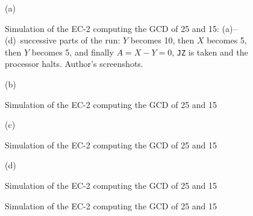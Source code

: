 \begin{figure}[htbp]
\centering
{\small (a)}\\[2pt]
\caption{Simulation of the EC-2 computing the GCD of 25 and 15: (a)--(d)~successive parts of the run: $Y$ becomes 10, then $X$ becomes 5, then $Y$ becomes 5, and finally $A=X-Y=0$, \texttt{JZ} is taken and the processor halts. Author's screenshots.}
\label{fig:ec2-sim}
\end{figure}

\begin{figure}[htbp]
\centering
\ContinuedFloat
{}
{\small (b)}\\[2pt]
\caption[]{Simulation of the EC-2 computing the GCD of 25 and 15}
\end{figure}

\begin{figure}[htbp]
\centering
\ContinuedFloat
{}
{\small (c)}\\[2pt]
\caption[]{Simulation of the EC-2 computing the GCD of 25 and 15}
\end{figure}

\begin{figure}[htbp]
\centering
\ContinuedFloat
{}
{\small (d)}\\[2pt]
\caption[]{Simulation of the EC-2 computing the GCD of 25 and 15}
\end{figure}

\begin{figure}[htbp]
\centering
\ContinuedFloat
{}
\caption[]{Simulation of the EC-2 computing the GCD of 25 and 15}
\end{figure}


